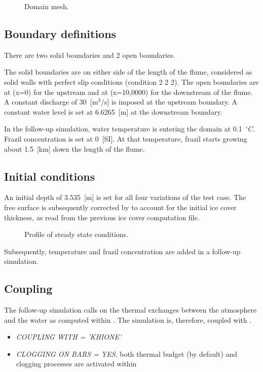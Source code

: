 \begin{figure}[H]
    \begin{center}
    \end{center}
    \caption{Domain mesh.}
    \label{fig:clogging_mesh}
\end{figure}

\subsection{Boundary definitions}
There are two solid boundaries and 2 open boundaries.\newline

The solid boundaries are on either side of the length of the flume, considered as solid walls with perfect slip conditions (condition 2 2 2).
The open boundaries are at (x=0) for the upstream and at (x=10,0000) for the downstream of the flume. A constant discharge of 30~[m$^3$/s] is imposed at the upstream boundary. A constant water level is set at 6.6265~[m] at the downstream boundary.\newline

In the follow-up simulation, water temperature is entering the domain at 0.1~$^\circ C$. Frazil concentration is set at 0~[SI]. At that temperature, frazil starts growing about 1.5~[km] down the length of the flume.\newline

\subsection{Initial conditions}
An initial depth of 3.535~[m] is set for all four variations of the test case. The free surface is subsequently corrected by \khione to account for the initial ice cover thickness, as read from the previous ice cover computation file.\newline

\begin{figure}[H]
    \begin{center}
    \end{center}
    \caption{Profile of steady state conditions.}
    \label{fig:clogging_profile}
\end{figure}

Subsequently, temperature and frazil concentration are added in a follow-up simulation.

\subsection{Coupling}
The follow-up simulation calls on the thermal exchanges between the atmosphere and the water as computed within \khione. The simulation is, therefore, coupled with \khione.
\begin{itemize}
    \item\textit{COUPLING WITH = 'KHIONE'}
    \item\textit{CLOGGING ON BARS = YES}, both thermal budget (by default) and clogging processes are activated within \khione
\end{itemize}

